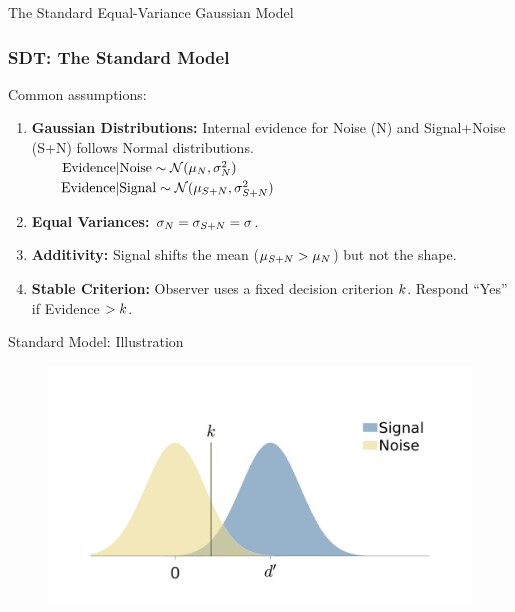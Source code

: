 \documentclass[aspectratio=169]{beamer}
\begin{document}
\begin{frame}{The Standard Equal-Variance Gaussian Model}
  \frametitle{SDT: The Standard Model}
  Common assumptions:
  \begin{enumerate}
    \item \textbf{Gaussian Distributions:} Internal evidence for Noise (N) and Signal+Noise (S+N) follows Normal distributions.
    \\[1ex]
     $\qquad \text{Evidence} | \text{Noise} \sim \mathcal{N}(\mu_N, \sigma_N^2)$
    \\[1ex]
     $\qquad \text{Evidence} | \text{Signal} \sim \mathcal{N}(\mu_{S+N}, \sigma_{S+N}^2)$
    \pause
    \item \textbf{Equal Variances:} $\sigma_N = \sigma_{S+N} = \sigma$.
    \pause
    \item \textbf{Additivity:} Signal shifts the mean ($\mu_{S+N} > \mu_N$) but not the shape.
    \pause
    \item \textbf{Stable Criterion:} Observer uses a fixed decision criterion $k$. Respond ``Yes'' if Evidence $> k$.
  \end{enumerate}
\end{frame}

\begin{frame}{Standard Model: Illustration}
    \begin{figure}
        \centering
        \includegraphics[width=\textwidth]{figures/signalDetectionTheory.pdf}
    \end{figure}
\end{frame}
\end{document}
